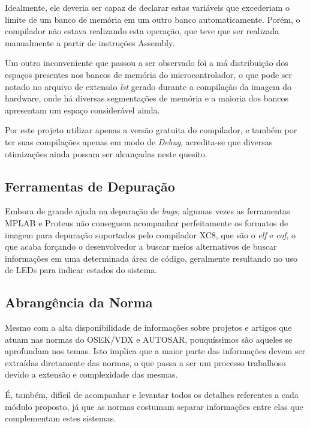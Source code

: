 Idealmente, ele deveria ser capaz de declarar estas variáveis que excederiam o limite de um banco de memória em um outro banco automaticamente. Porém, o compilador não estava realizando esta operação, que teve que ser realizada manualmente a partir de instruções Assembly.

Um outro inconveniente que passou a ser observado foi a má distribuição dos espaços presentes nos bancos de memória do microcontrolador, o que pode ser notado no arquivo de extensão \emph{lst} gerado durante a compilação da imagem do hardware, onde há diversas segmentações de memória e a maioria dos bancos apresentam um espaço considerável ainda.

Por este projeto utilizar apenas a versão gratuita do compilador, e também por ter suas compilações apenas em modo de \emph{Debug}, acredita-se que diversas otimizações ainda possam ser alcançadas neste quesito.

\subsection{Ferramentas de Depuração}

Embora de grande ajuda na depuração de \emph{bugs}, algumas vezes as ferramentas MPLAB e Proteus não conseguem acompanhar perfeitamente os formatos de imagem para depuração suportados pelo compilador XC8, que são o \emph{elf} e \emph{cof}, o que acaba forçando o desenvolvedor a buscar meios alternativos de buscar informações em uma determinada área de código, geralmente resultando no uso de LEDs para indicar estados do sistema.

\subsection{Abrangência da Norma}

Mesmo com a alta disponibilidade de informações sobre projetos e artigos que atuam nas normas do OSEK/VDX e AUTOSAR, pouquíssimos são aqueles se aprofundam nos temas. Isto implica que a maior parte das informações devem ser extraídas diretamente das normas, o que passa a ser um processo trabalhoso devido a extensão e complexidade das mesmas.

É, também, difícil de acompanhar e levantar todos os detalhes referentes a cada módulo proposto, já que as normas costumam separar informações entre elas que complementam estes sistemas.
